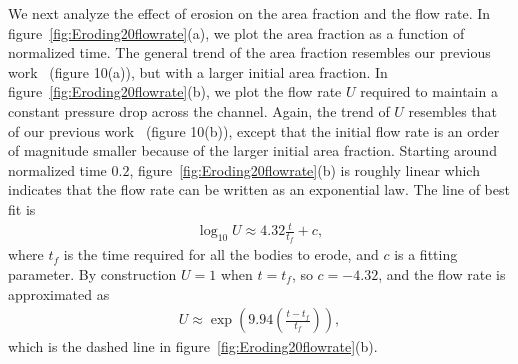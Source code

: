 \documentclass{jfm}
\begin{document}
We next analyze the effect of erosion on the area fraction and the flow
rate.  In figure~\ref{fig:Eroding20flowrate}(a), we plot the area
fraction as a function of normalized time.  The general trend of the
area fraction resembles our previous work~\citep{qua-moo2018} (figure
10(a)), but with a larger initial area fraction.  In
figure~\ref{fig:Eroding20flowrate}(b), we plot the flow rate $U$
required to maintain a constant pressure drop across the channel.
Again, the trend of $U$ resembles that of our previous
work~\citep{qua-moo2018} (figure 10(b)), except that the initial flow
rate is an order of magnitude smaller because of the larger initial area
fraction.  Starting around normalized time $0.2$,
figure~\ref{fig:Eroding20flowrate}(b) is roughly linear which indicates
that the flow rate can be written as an exponential law.  The line of
best fit is
\begin{align} 
  \log_{10} U \approx 4.32 \frac{t}{t_f} + c, 
\end{align}
where $t_f$ is the time required for all the bodies to erode, and $c$ is
a fitting parameter. By construction $U = 1$ when $t=t_f$, so $c=-4.32$,
and the flow rate is approximated as
\begin{align}
  U \approx \exp\left(9.94 \left(\frac{t - t_f}{t_f} \right)\right),
\end{align}
which is the dashed line in figure~\ref{fig:Eroding20flowrate}(b).
\end{document}
